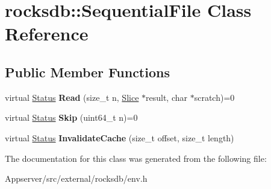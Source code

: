 \hypertarget{classrocksdb_1_1SequentialFile}{}\section{rocksdb\+:\+:Sequential\+File Class Reference}
\label{classrocksdb_1_1SequentialFile}
\subsection*{Public Member Functions}
\begin{DoxyCompactItemize}
\item 
virtual \hyperlink{classrocksdb_1_1Status}{Status} {\bfseries Read} (size\+\_\+t n, \hyperlink{classrocksdb_1_1Slice}{Slice} $\ast$result, char $\ast$scratch)=0\hypertarget{classrocksdb_1_1SequentialFile_a73ad8155e9996d5430081aaac7eb0d00}{}\label{classrocksdb_1_1SequentialFile_a73ad8155e9996d5430081aaac7eb0d00}

\item 
virtual \hyperlink{classrocksdb_1_1Status}{Status} {\bfseries Skip} (uint64\+\_\+t n)=0\hypertarget{classrocksdb_1_1SequentialFile_a7631793bdbfe43ddbd7a5326939c056a}{}\label{classrocksdb_1_1SequentialFile_a7631793bdbfe43ddbd7a5326939c056a}

\item 
virtual \hyperlink{classrocksdb_1_1Status}{Status} {\bfseries Invalidate\+Cache} (size\+\_\+t offset, size\+\_\+t length)\hypertarget{classrocksdb_1_1SequentialFile_aed3847c9352221eba27eb9c58fe2d287}{}\label{classrocksdb_1_1SequentialFile_aed3847c9352221eba27eb9c58fe2d287}

\end{DoxyCompactItemize}


The documentation for this class was generated from the following file\+:\begin{DoxyCompactItemize}
\item 
Appserver/src/external/rocksdb/env.\+h\end{DoxyCompactItemize}
